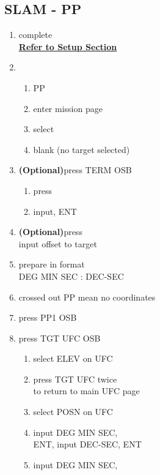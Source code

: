 \documentclass[fontInter, widesubsec]{TechCheck}
\begin{document}
	\subsection{SLAM - PP}
	\begin{enumerate}
		\item {}\dotfill complete \\
		\hfill \hyperref[subsec:84setup]{\textbf{Refer to Setup Section}}
		\item {}
		\begin{enumerate}
			\item {}\dotfill PP
			\item {}\dotfill enter mission page
			\item {}\dotfill select
			\item {}\dotfill blank (no target selected)
		\end{enumerate}
		\item {} \textbf{(Optional)}\dotfill press TERM OSB
		\begin{enumerate}
			\item {}\dotfill press
			\item {}\dotfill input, ENT
		\end{enumerate}
		\item {} \textbf{(Optional)}\dotfill press \\
		\hfill input offset to target
		\item {}\dotfill prepare in format \\ \hfill DEG MIN SEC : DEC-SEC
		\item {}\dotfill crossed out PP mean no coordinates
		\item {}\dotfill press PP1 OSB
		\item {}\dotfill press TGT UFC OSB
		\begin{enumerate}
			\item {}\dotfill select ELEV on UFC
			\item {}\dotfill press TGT UFC twice\\
			\hfill to return to main UFC page
			\item {}\dotfill select POSN on UFC
			\item {}\dotfill input DEG MIN SEC, \\
			\hfill ENT, input DEC-SEC, ENT
			\item {}\dotfill input DEG MIN SEC, \\

\end{enumerate}
\end{enumerate}
\end{document}
